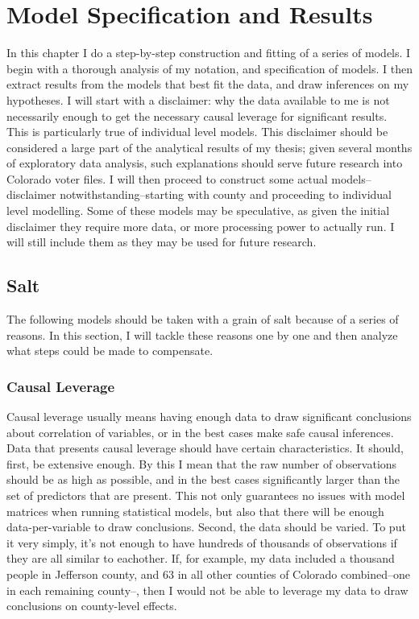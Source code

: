 \documentclass[12pt,twoside]{reedthesis}
\begin{document}
  \chapter{Model Specification and
  Results}\label{model-specification-and-results}
  
  In this chapter I do a step-by-step construction and fitting of a series
  of models. I begin with a thorough analysis of my notation, and
  specification of models. I then extract results from the models that
  best fit the data, and draw inferences on my hypotheses. I will start
  with a disclaimer: why the data available to me is not necessarily
  enough to get the necessary causal leverage for significant results.
  This is particularly true of individual level models. This disclaimer
  should be considered a large part of the analytical results of my
  thesis; given several months of exploratory data analysis, such
  explanations should serve future research into Colorado voter files. I
  will then proceed to construct some actual models--disclaimer
  notwithstanding--starting with county and proceeding to individual level
  modelling. Some of these models may be speculative, as given the initial
  disclaimer they require more data, or more processing power to actually
  run. I will still include them as they may be used for future research.
  
  \section{Salt}\label{salt}
  
  The following models should be taken with a grain of salt because of a
  series of reasons. In this section, I will tackle these reasons one by
  one and then analyze what steps could be made to compensate.
  
  \subsection{Causal Leverage}\label{causal-leverage}
  
  Causal leverage usually means having enough data to draw significant
  conclusions about correlation of variables, or in the best cases make
  safe causal inferences. Data that presents causal leverage should have
  certain characteristics. It should, first, be extensive enough. By this
  I mean that the raw number of observations should be as high as
  possible, and in the best cases significantly larger than the set of
  predictors that are present. This not only guarantees no issues with
  model matrices when running statistical models, but also that there will
  be enough data-per-variable to draw conclusions. Second, the data should
  be varied. To put it very simply, it's not enough to have hundreds of
  thousands of observations if they are all similar to eachother. If, for
  example, my data included a thousand people in Jefferson county, and 63
  in all other counties of Colorado combined--one in each remaining
  county--, then I would not be able to leverage my data to draw
  conclusions on county-level effects.
  
\end{document}
